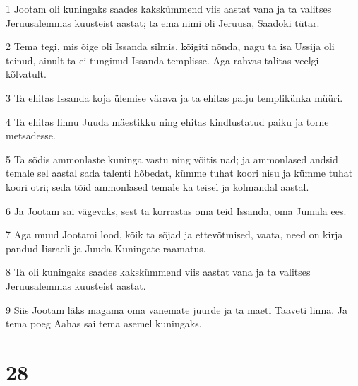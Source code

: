 \par 1 Jootam oli kuningaks saades kakskümmend viis aastat vana ja ta valitses Jeruusalemmas kuusteist aastat; ta ema nimi oli Jeruusa, Saadoki tütar.
\par 2 Tema tegi, mis õige oli Issanda silmis, kõigiti nõnda, nagu ta isa Ussija oli teinud, ainult ta ei tunginud Issanda templisse. Aga rahvas talitas veelgi kõlvatult.
\par 3 Ta ehitas Issanda koja ülemise värava ja ta ehitas palju templikünka müüri.
\par 4 Ta ehitas linnu Juuda mäestikku ning ehitas kindlustatud paiku ja torne metsadesse.
\par 5 Ta sõdis ammonlaste kuninga vastu ning võitis nad; ja ammonlased andsid temale sel aastal sada talenti hõbedat, kümme tuhat koori nisu ja kümme tuhat koori otri; seda tõid ammonlased temale ka teisel ja kolmandal aastal.
\par 6 Ja Jootam sai vägevaks, sest ta korrastas oma teid Issanda, oma Jumala ees.
\par 7 Aga muud Jootami lood, kõik ta sõjad ja ettevõtmised, vaata, need on kirja pandud Iisraeli ja Juuda Kuningate raamatus.
\par 8 Ta oli kuningaks saades kakskümmend viis aastat vana ja ta valitses Jeruusalemmas kuusteist aastat.
\par 9 Siis Jootam läks magama oma vanemate juurde ja ta maeti Taaveti linna. Ja tema poeg Aahas sai tema asemel kuningaks.

\chapter{28}

